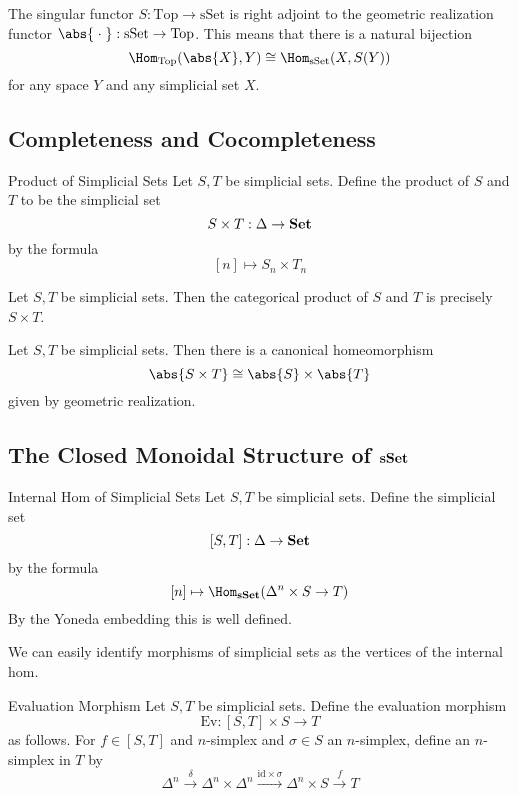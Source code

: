 \documentclass[a4paper]{article}
\begin{document}
\begin{thm}{}{} The singular functor $S:\text{Top}\to\text{sSet}$ is right adjoint to the geometric realization functor $\abs{\;\cdot\;}:\text{sSet}\to\text{Top}$. This means that there is a natural bijection $$\Hom_\text{Top}(\abs{X},Y)\cong\Hom_\text{sSet}(X,S(Y))$$ for any space $Y$ and any simplicial set $X$. 
\end{thm}

\subsection{Completeness and Cocompleteness}
\begin{defn}{Product of Simplicial Sets}{} Let $S,T$ be simplicial sets. Define the product of $S$ and $T$ to be the simplicial set $$S\times T:\Delta\to\bold{Set}$$ by the formula $$[n]\mapsto S_n\times T_n$$
\end{defn}

\begin{prp}{}{} Let $S,T$ be simplicial sets. Then the categorical product of $S$ and $T$ is precisely $S\times T$. 
\end{prp}

\begin{lmm}{}{} Let $S,T$ be simplicial sets. Then there is a canonical homeomorphism $$\abs{S\times T}\cong\abs{S}\times\abs{T}$$ given by geometric realization. 
\end{lmm}

\subsection{The Closed Monoidal Structure of $\bold{sSet}$}
\begin{defn}{Internal Hom of Simplicial Sets}{} Let $S,T$ be simplicial sets. Define the simplicial set $$[S,T]:\Delta\to\bold{Set}$$ by the formula $$[n]\mapsto\Hom_\bold{sSet}(\Delta^n\times S\to T)$$ By the Yoneda embedding this is well defined. 
\end{defn}

We can easily identify morphisms of simplicial sets as the vertices of the internal hom. 

\begin{defn}{Evaluation Morphism}{} Let $S,T$ be simplicial sets. Define the evaluation morphism $$\text{Ev}:[S,T]\times S\to T$$ as follows. For $f\in[S,T]$ and $n$-simplex and $\sigma\in S$ an $n$-simplex, define an $n$-simplex in $T$ by $$\Delta^n\overset{\delta}{\rightarrow}\Delta^n\times\Delta^n\overset{\text{id}\times\sigma}{\rightarrow}\Delta^n\times S\overset{f}{\rightarrow}T$$
\end{defn}
\end{document}

